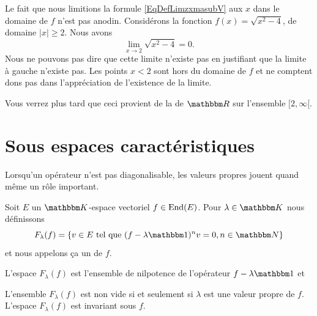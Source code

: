 \begin{remark}
    Le fait que nous limitions la formule \eqref{EqDefLimzxmasubV} aux \( x\) dans le domaine de \( f\) n'est pas anodin. Considérons la fonction \( f(x)=\sqrt{x^2-4}\), de domaine \( | x |\geq 2\). Nous avons
    \begin{equation}
        \lim_{x\to 2} \sqrt{x^2-4}=0.
    \end{equation}
    Nous ne pouvons pas dire que cette limite n'existe pas en justifiant que la limite à gauche n'existe pas. Les points \( x<2\) sont hors du domaine de \( f\) et ne comptent dons pas dans l'appréciation de l'existence de la limite.

    Vous verrez plus tard que ceci provient de la  de \( \eR\) sur l'ensemble \( \mathopen[ 2 , \infty [\).
\end{remark}

\section{Sous espaces caractéristiques}


Lorsqu'un opérateur n'est pas diagonalisable, les valeurs propres jouent quand même un rôle important.

\begin{definition}  \label{DefFBNIooCGbIix}
    Soit \( E\) un \( \eK\)-espace vectoriel  \( f\in\operatorname{End}(E)\). Pour \( \lambda\in \eK\) nous définissons
    \begin{equation}
        F_{\lambda}(f)=\{ v\in E\tq (f-\lambda\mtu)^nv=0, n\in\eN \}
    \end{equation}
    et nous appelons ça un  de \( f\).
\end{definition}
L'espace \( F_{\lambda}(f)\) est l'ensemble de nilpotence de l'opérateur \( f-\lambda\mtu\) et

\begin{lemma}   \label{LemBLPooHMAoyJ}
    L'ensemble \( F_{\lambda}(f)\) est non vide si et seulement si \( \lambda\) est une valeur propre de \( f\). L'espace \( F_{\lambda}(f)\) est invariant sous \( f\).
\end{lemma}

